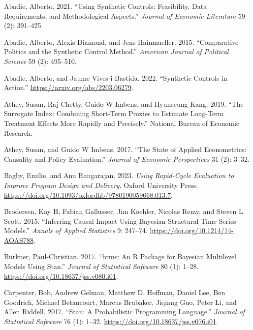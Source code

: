 \documentclass[
  letterpaper,
  DIV=11,
  numbers=noendperiod]{scrreprt}
\newlength{\cslhangindent}
\newenvironment{CSLReferences}[2] %
 {\begin{list}{}{%
  \setlength{\itemindent}{0pt}
  \setlength{\leftmargin}{0pt}
  \setlength{\parsep}{0pt}
  \ifodd #1
   \setlength{\leftmargin}{\cslhangindent}
   \setlength{\itemindent}{-1\cslhangindent}
  \fi
  \setlength{\itemsep}{#2\baselineskip}}}
 {\end{list}}
\begin{document}
\label{refs}
\begin{CSLReferences}{1}{0}
Abadie, Alberto. 2021. {``Using Synthetic Controls: Feasibility, Data
Requirements, and Methodological Aspects.''} \emph{Journal of Economic
Literature} 59 (2): 391--425.

Abadie, Alberto, Alexis Diamond, and Jens Hainmueller. 2015.
{``Comparative Politics and the Synthetic Control Method.''}
\emph{American Journal of Political Science} 59 (2): 495--510.

Abadie, Alberto, and Jaume Vives-i-Bastida. 2022. {``Synthetic Controls
in Action.''} \url{https://arxiv.org/abs/2203.06279}.

Athey, Susan, Raj Chetty, Guido W Imbens, and Hyunseung Kang. 2019.
{``The Surrogate Index: Combining Short-Term Proxies to Estimate
Long-Term Treatment Effects More Rapidly and Precisely.''} National
Bureau of Economic Research.

Athey, Susan, and Guido W Imbens. 2017. {``The State of Applied
Econometrics: Causality and Policy Evaluation.''} \emph{Journal of
Economic Perspectives} 31 (2): 3--32.

Bagby, Emilie, and Anu Rangarajan. 2023. \emph{{Using Rapid-Cycle
Evaluation to Improve Program Design and Delivery}}. Oxford University
Press. \url{https://doi.org/10.1093/oxfordhb/9780190059668.013.7}.

Brodersen, Kay H, Fabian Gallusser, Jim Koehler, Nicolas Remy, and
Steven L Scott. 2015. {``Inferring Causal Impact Using Bayesian
Structural Time-Series Models.''} \emph{Annals of Applied Statistics} 9:
247--74. \url{https://doi.org/10.1214/14-AOAS788}.

Bürkner, Paul-Christian. 2017. {``{brms}: An {R} Package for {Bayesian}
Multilevel Models Using {Stan}.''} \emph{Journal of Statistical
Software} 80 (1): 1--28. \url{https://doi.org/10.18637/jss.v080.i01}.

Carpenter, Bob, Andrew Gelman, Matthew D. Hoffman, Daniel Lee, Ben
Goodrich, Michael Betancourt, Marcus Brubaker, Jiqiang Guo, Peter Li,
and Allen Riddell. 2017. {``Stan: A Probabilistic Programming
Language.''} \emph{Journal of Statistical Software} 76 (1): 1--32.
\url{https://doi.org/10.18637/jss.v076.i01}.


\end{CSLReferences}
\end{document}
